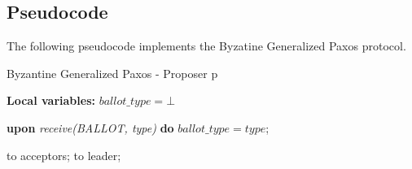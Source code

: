 \subsection{Pseudocode}
The following pseudocode implements the Byzatine Generalized Paxos protocol.%

\begin{algorithm} 
	\caption{Byzantine Generalized Paxos - Proposer p}
	\label{BFT-Prop}
	\textbf{Local variables:} $ballot\_type = \bot$
	\begin{algorithmic}[1]
			
		\State \textbf{upon} \textit{receive(BALLOT, type)} \textbf{do} 
		\State \hspace{\algorithmicindent} $ballot\_type = type$;
		\State
		
		\State {} to acceptors;
		\Else
		\State {} to leader;
		\EndIf
		\EndFunction
		
	\end{algorithmic}
\end{algorithm}

